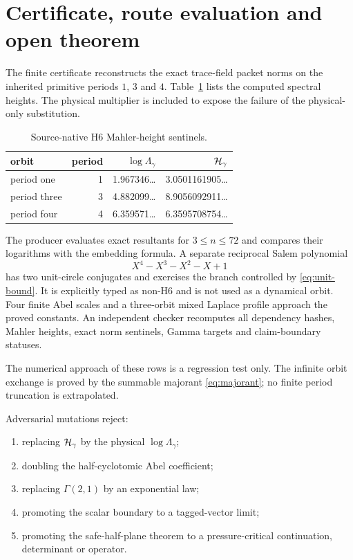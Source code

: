 \section{Certificate, route evaluation and open theorem}

The finite certificate reconstructs the exact trace-field packet norms on
the inherited primitive periods $1$, $3$ and $4$.  Table~\ref{tab:sentinels}
lists the computed spectral heights.  The physical multiplier is included
to expose the failure of the physical-only substitution.

\begin{table}[ht]
\centering
\caption{Source-native H6 Mahler-height sentinels.}
\label{tab:sentinels}
\begin{tabular}{@{}lrrr@{}}
\toprule
orbit & period & $\log\Lambda_\gamma$ & $\mathcal H_\gamma$\\
\midrule
period one   & 1 & 1.967346\ldots & 3.0501161905\ldots\\
period three & 3 & 4.882099\ldots & 8.9056092911\ldots\\
period four  & 4 & 6.359571\ldots & 6.3595708754\ldots\\
\bottomrule
\end{tabular}
\end{table}

The producer evaluates exact resultants for $3\le n\le72$ and compares
their logarithms with the embedding formula.  A separate reciprocal Salem
polynomial
\[
 X^4-X^3-X^2-X+1
\]
has two unit-circle conjugates and exercises the branch controlled by
\eqref{eq:unit-bound}.  It is explicitly typed as non-H6 and is not used as
a dynamical orbit.  Four finite Abel scales and a three-orbit mixed Laplace
profile approach the proved constants.  An independent checker recomputes
all dependency hashes, Mahler heights, exact norm sentinels, Gamma targets
and claim-boundary statuses.

The numerical approach of these rows is a regression test only.  The
infinite orbit exchange is proved by the summable majorant
\eqref{eq:majorant}; no finite period truncation is extrapolated.

Adversarial mutations reject:
\begin{enumerate}
\item replacing $\mathcal H_\gamma$ by the physical
      $\log\Lambda_\gamma$;
\item doubling the half-cyclotomic Abel coefficient;
\item replacing $\Gamma(2,1)$ by an exponential law;
\item promoting the scalar boundary to a tagged-vector limit;
\item promoting the safe-half-plane theorem to a pressure-critical
      continuation, determinant or operator.
\end{enumerate}

